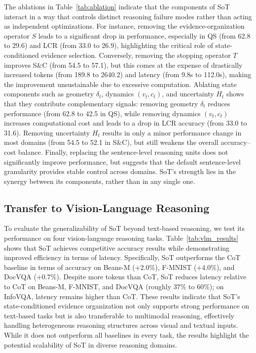     The ablations in Table~\ref{tab:ablation} indicate that the components of SoT interact in a way that controls distinct reasoning failure modes rather than acting as independent optimizations. For instance, removing the evidence-organization operator \(S\) leads to a significant drop in performance, especially in QS (from 62.8 to 29.6) and LCR (from 33.0 to 26.9), highlighting the critical role of state-conditioned evidence selection. Conversely, removing the stopping operator \(T\) improves S\&C (from 54.5 to 57.1), but this comes at the expense of drastically increased tokens (from 189.8 to 2640.2) and latency (from 9.8s to 112.0s), making the improvement unsustainable due to excessive computation. Ablating state components such as geometry \(\delta_t\), dynamics \((v_t, c_t)\), and uncertainty \(H_t\) shows that they contribute complementary signals: removing geometry \(\delta_t\) reduces performance (from 62.8 to 42.5 in QS), while removing dynamics \((v_t, c_t)\) increases computational cost and leads to a drop in LCR accuracy (from 33.0 to 31.6). Removing uncertainty \(H_t\) results in only a minor performance change in most domains (from 54.5 to 52.1 in S\&C), but still weakens the overall accuracy--cost balance. Finally, replacing the sentence-level reasoning units does not significantly improve performance, but suggests that the default sentence-level granularity provides stable control across domains. SoT's strength lies in the synergy between its components, rather than in any single one.

    \vspace{-1.0mm}
    \subsection{Transfer to Vision-Language Reasoning}
    \label{sec:vlm_results}
    \vspace{-1.0mm}

    To evaluate the generalizability of SoT beyond text-based reasoning, we test its performance on four vision-language reasoning tasks. Table~\ref{tab:vlm_results} shows that SoT achieves competitive accuracy results while demonstrating improved efficiency in terms of latency. Specifically, SoT outperforms the CoT baseline in terms of accuracy on Beans-M (\(+2.0\%\)), F-MNIST (\(+4.0\%\)), and DocVQA (\(+0.7\%\)). Despite more tokens than CoT, SoT reduces latency relative to CoT on Beans-M, F-MNIST, and DocVQA (roughly \(37\%\) to \(60\%\)); on InfoVQA, latency remains higher than CoT. These results indicate that SoT’s state-conditioned evidence organization not only supports strong performance on text-based tasks but is also transferable to multimodal reasoning, effectively handling heterogeneous reasoning structures across visual and textual inputs. While it does not outperform all baselines in every task, the results highlight the potential scalability of SoT in diverse reasoning domains.


